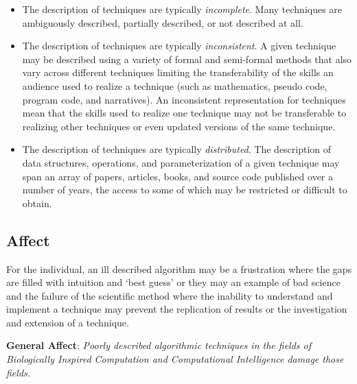 \documentclass[a4paper, 11pt]{article}
\begin{document}
\begin{itemize}
	\item The description of techniques are typically \emph{incomplete}. Many techniques are ambiguously described, partially described, or not described at all.
	\item The description of techniques are typically \emph{inconsistent}. A given technique may be described using a variety of formal and semi-formal methods that also vary across different techniques limiting the transferability of the skills an audience used to realize a technique (such as mathematics, pseudo code, program code, and narratives). An inconsistent representation for techniques mean that the skills used to realize one technique may not be transferable to realizing other techniques or even updated versions of the same technique.
	\item The description of techniques are typically \emph{distributed}. The description of data structures, operations, and parameterization of a given technique may span an array of papers, articles, books, and source code published over a number of years, the access to some of which may be restricted or difficult to obtain.
\end{itemize}

\subsection{Affect}
For the individual, an ill described algorithm may be a frustration where the gaps are filled with intuition and `best guess' or they may an example of bad science and the failure of the scientific method where the inability to understand and implement a technique may prevent the replication of results or the investigation and extension of a technique. 

\textbf{General Affect}: \emph{Poorly described algorithmic techniques in the fields of Biologically Inspired Computation and Computational Intelligence damage those fields.}
\end{document}
